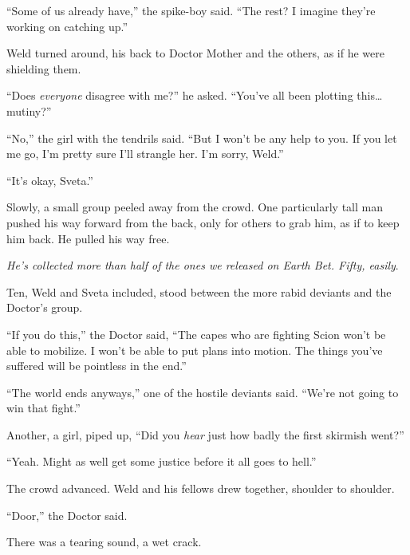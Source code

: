 ``Some of us already have,'' the spike-boy said.  ``The rest?  I imagine they're working on catching up.''



Weld turned around, his back to Doctor Mother and the others, as if he were shielding them.



``Does \emph{everyone} disagree with me?'' he asked.  ``You've all been plotting this\ldots mutiny?''



``No,'' the girl with the tendrils said.  ``But I won't be any help to you.  If you let me go, I'm pretty sure I'll strangle her.  I'm sorry, Weld.''



``It's okay, Sveta.''



Slowly, a small group peeled away from the crowd.  One particularly tall man pushed his way forward from the back, only for others to grab him, as if to keep him back.  He pulled his way free.



\emph{He's collected more than half of the ones we released on Earth Bet.  Fifty, easily}.



Ten, Weld and Sveta included, stood between the more rabid deviants and the Doctor's group.



``If you do this,'' the Doctor said, ``The capes who are fighting Scion won't be able to mobilize.  I won't be able to put plans into motion.  The things you've suffered will be pointless in the end.''



``The world ends anyways,'' one of the hostile deviants said.  ``We're not going to win that fight.''



Another, a girl, piped up, ``Did you \emph{hear} just how badly the first skirmish went?''



``Yeah.  Might as well get some justice before it all goes to hell.''



The crowd advanced.  Weld and his fellows drew together, shoulder to shoulder.



``Door,'' the Doctor said.



There was a tearing sound, a wet crack.




